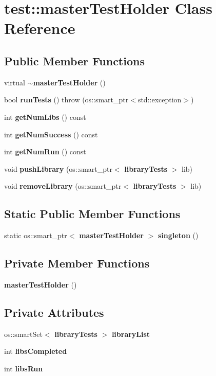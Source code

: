 \section{test\+:\+:master\+Test\+Holder Class Reference}
\label{classtest_1_1masterTestHolder}
\subsection*{Public Member Functions}
\begin{DoxyCompactItemize}
\item 
virtual {\bf $\sim$master\+Test\+Holder} ()
\item 
bool {\bf run\+Tests} ()  throw (os\+::smart\+\_\+ptr$<$std\+::exception$>$)
\item 
int {\bf get\+Num\+Libs} () const 
\item 
int {\bf get\+Num\+Success} () const 
\item 
int {\bf get\+Num\+Run} () const 
\item 
void {\bf push\+Library} (os\+::smart\+\_\+ptr$<$ {\bf library\+Tests} $>$ lib)
\item 
void {\bf remove\+Library} (os\+::smart\+\_\+ptr$<$ {\bf library\+Tests} $>$ lib)
\end{DoxyCompactItemize}
\subsection*{Static Public Member Functions}
\begin{DoxyCompactItemize}
\item 
static os\+::smart\+\_\+ptr$<$ {\bf master\+Test\+Holder} $>$ {\bf singleton} ()
\end{DoxyCompactItemize}
\subsection*{Private Member Functions}
\begin{DoxyCompactItemize}
\item 
{\bf master\+Test\+Holder} ()
\end{DoxyCompactItemize}
\subsection*{Private Attributes}
\begin{DoxyCompactItemize}
\item 
os\+::smart\+Set$<$ {\bf library\+Tests} $>$ {\bf library\+List}
\item 
int {\bf libs\+Completed}
\item 
int {\bf libs\+Run}
\end{DoxyCompactItemize}


